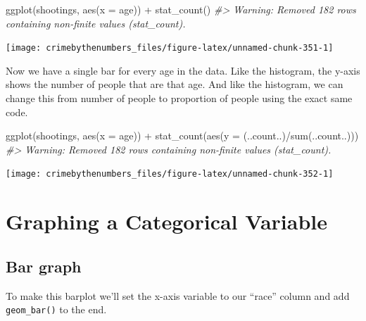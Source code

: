 \documentclass[
]{krantz}
\makeatletter
\newenvironment{Shaded}{\begin{snugshade}}{\end{snugshade}}
\newcommand{\AttributeTok}[1]{\textcolor[rgb]{0.61,0.61,0.61}{#1}}
\newcommand{\CommentTok}[1]{\textcolor[rgb]{0.37,0.37,0.37}{\textit{#1}}}
\newcommand{\FunctionTok}[1]{\textcolor[rgb]{0,0,0}{#1}}
\newcommand{\NormalTok}[1]{#1}
\newcommand{\SpecialCharTok}[1]{\textcolor[rgb]{0,0,0}{#1}}
\newenvironment{kframe}{%
\medskip{}
\setlength{\fboxsep}{.8em}
 \def\at@end@of@kframe{}%
 \ifinner\ifhmode%
  \def\at@end@of@kframe{\end{minipage}}%
  \begin{minipage}{\columnwidth}%
 \fi\fi%
 \def\FrameCommand##1{\hskip\@totalleftmargin \hskip-\fboxsep
 \colorbox{shadecolor}{##1}\hskip-\fboxsep
     \hskip-\linewidth \hskip-\@totalleftmargin \hskip\columnwidth}%
 \MakeFramed {\advance\hsize-\width
   \@totalleftmargin\z@ \linewidth\hsize
   \@setminipage}}%
 {\par\unskip\endMakeFramed%
 \at@end@of@kframe}
\renewenvironment{Shaded}{\begin{kframe}}{\end{kframe}}
\makeatother
\begin{document}
\begin{Shaded}
\begin{Highlighting}[]
\FunctionTok{ggplot}\NormalTok{(shootings, }\FunctionTok{aes}\NormalTok{(}\AttributeTok{x =}\NormalTok{ age)) }\SpecialCharTok{+} 
  \FunctionTok{stat\_count}\NormalTok{()}
\CommentTok{\#\textgreater{} Warning: Removed 182 rows containing non{-}finite values (stat\_count).}
\end{Highlighting}
\end{Shaded}

\begin{center}\texttt{[image: crimebythenumbers\_files/figure-latex/unnamed-chunk-351-1]} \end{center}

Now we have a single bar for every age in the data. Like the histogram, the y-axis shows the number of people that are that age. And like the histogram, we can change this from number of people to proportion of people using the exact same code.

\begin{Shaded}
\begin{Highlighting}[]
\FunctionTok{ggplot}\NormalTok{(shootings, }\FunctionTok{aes}\NormalTok{(}\AttributeTok{x =}\NormalTok{ age)) }\SpecialCharTok{+} 
  \FunctionTok{stat\_count}\NormalTok{(}\FunctionTok{aes}\NormalTok{(}\AttributeTok{y =}\NormalTok{ (..count..)}\SpecialCharTok{/}\FunctionTok{sum}\NormalTok{(..count..)))}
\CommentTok{\#\textgreater{} Warning: Removed 182 rows containing non{-}finite values (stat\_count).}
\end{Highlighting}
\end{Shaded}

\begin{center}\texttt{[image: crimebythenumbers\_files/figure-latex/unnamed-chunk-352-1]} \end{center}

\hypertarget{graphing-a-categorical-variable}{%
\section{Graphing a Categorical Variable}\label{graphing-a-categorical-variable}}

\hypertarget{bar-graph}{%
\subsection{Bar graph}\label{bar-graph}}

To make this barplot we'll set the x-axis variable to our ``race'' column and add \texttt{geom\_bar()} to the end.
\end{document}
